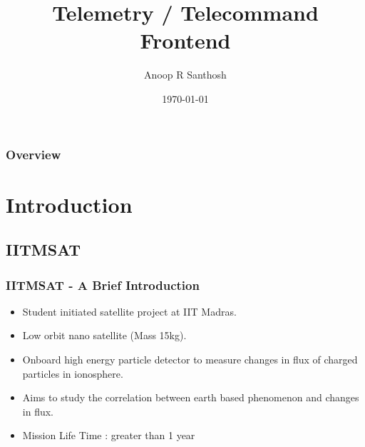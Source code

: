 \documentclass{beamer}
\title[TMTC FE]{Telemetry / Telecommand Frontend} %
\author{Anoop R Santhosh} %
\institute[IITM] %
{
Indian Institute of Technology, Madras \\ %
\medskip
\textit{anoop@cse.iitm.ac.in} %
}
\date{\today} %
\begin{document}
\begin{frame}
\titlepage %
\end{frame}

\begin{frame}
\frametitle{Overview} %
\tableofcontents %
\end{frame}


\section{Introduction} %

\subsection{IITMSAT} %

\begin{frame}
\frametitle{IITMSAT - A Brief Introduction}
\pause
\begin{itemize}
\item Student initiated satellite project at IIT Madras.
\pause
\item Low orbit nano satellite (Mass 15kg).
\pause
\item Onboard high energy particle detector to measure changes in flux of charged particles in ionosphere.
\pause
\item Aims to study the correlation between earth based phenomenon and changes in flux.
\pause
\item Mission Life Time : greater than 1 year

\end{itemize}
\end{frame}
\end{document}

